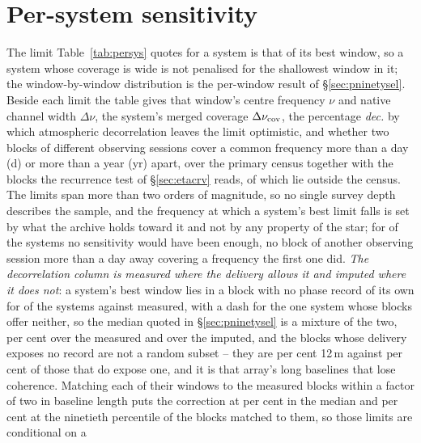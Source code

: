 \section{Per-system sensitivity}
\label{app:persys}

The limit Table~\ref{tab:persys} quotes for a system is that of its best
window, so a system whose coverage is wide is not penalised for the
shallowest window in it; the window-by-window distribution is the per-window
result of \S\ref{sec:pninetysel}. Beside each limit the table
gives that window's centre frequency $\nu$ and native channel width
$\Delta\nu$, the system's merged coverage $\Delta\nu_{\rm cov}$, the
percentage \emph{dec.} by which atmospheric decorrelation leaves the limit
optimistic, and whether two blocks of different observing sessions cover a
common frequency more than a day (d) or more than a year (yr) apart, over the
primary census together with the \ZcNRecEB{} blocks the recurrence
test of \S\ref{sec:etacrv} reads, of which \ZcNRecEBOut{} lie outside the
census. The limits span more than two orders of
magnitude, so no single survey depth describes the sample, and the frequency
at which a system's best limit falls is set by what the archive holds toward
it and not by any property of the star; for \ZcNoRepSys{} of the
\NSysClassA{} systems no sensitivity would have been enough, no block of
another observing session more than a day away covering a frequency the
first one did. \emph{The decorrelation column is measured where the delivery
allows it and imputed where it does not}: a system's best window lies in a
block with no phase record of its own for \NgNDecImpSys{} of the systems
against \NgNDecMeasSys{} measured, with a dash for the one system whose
blocks offer neither, so the median quoted in
\S\ref{sec:pninetysel} is a mixture of the two, \NgDecMeasMedPct{} per cent
over the measured and \NgDecImpMedPct{} over the imputed, and the blocks
whose delivery exposes no record are not a random subset -- they are
\NbDecPctTwelveUn{} per cent 12\,m against \NbDecPctTwelveMeas{} per cent of
those that do expose one, and it is that array's long baselines that lose
coherence. Matching each of their windows to the measured blocks within a
factor of two in baseline length puts the correction at \RpDecMatchMed{} per
cent in the median and \RpDecMatchHi{} per cent at the ninetieth percentile
of the blocks matched to them, so those limits are conditional on a
